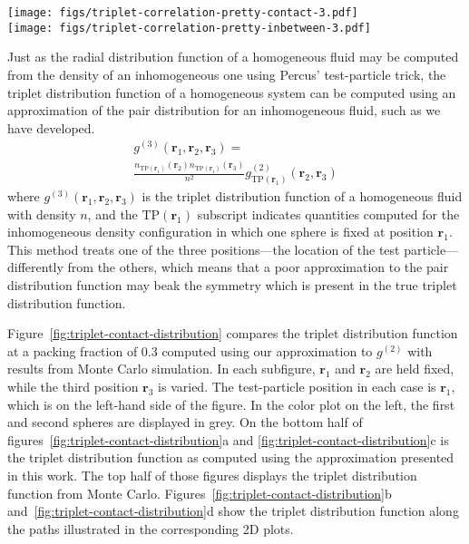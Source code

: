 \documentclass[letterpaper,twocolumn,amsmath,amssymb,pre,aps,10pt]{revtex4-1}
\newcommand{\red}[1]{{\bf \color{red} #1}}
\newcommand{\rr}{\textbf{r}}
\newcommand{\fixme}[1]{\red{[#1]}}
\begin{document}
\begin{figure*}
  \texttt{[image: figs/triplet-correlation-pretty-contact-3.pdf]}\\
  \texttt{[image: figs/triplet-correlation-pretty-inbetween-3.pdf]}
  \caption{\fixme{Remove one of, or make a note of, the two curves for this
      work}\fixme{Fix MC issue here (volume wrong?)} \fixme{Add backward curve
      for this work mc?}\fixme{z-axis wrong}The triplet
    distribution function $g^{(3)}(\rr_1,\rr_2,\rr_3)$ at packing fraction 0.3,
    plotted when $\rr_1$ and $\rr_2$ are in contact.  The color plot on the left
    shows the triplet distribution function, with white corresponding to the
    contact value of the \emph{pair} distribution function.  The plot on the
    right shows the value of $g^{(3)}$ along the path shown as a dotted line on
    the plot to the left.}\label{fig:triplet-contact-distribution}
\end{figure*}

Just as the radial distribution function of a homogeneous fluid may be
computed from the density of an inhomogeneous one using Percus'
test-particle trick, the triplet distribution function of a
homogeneous system can be computed using an approximation of the pair
distribution for an inhomogeneous fluid, such as we have developed.
\begin{multline}
    g^{(3)}(\rr_1,\rr_2,\rr_3) =\\
    \frac{n_{\textrm{TP}(\rr_1)}(\rr_2)
      n_{\textrm{TP}(\rr_1)}(\rr_3)}{n^2}
    g^{(2)}_{\textrm{TP}(\rr_1)}(\rr_2,\rr_3)
\end{multline}
where $g^{(3)}(\rr_1,\rr_2,\rr_3)$ is the triplet distribution
function of a homogeneous fluid with density $n$, and the
$\textrm{TP}(\rr_1)$ subscript indicates quantities computed for the
inhomogeneous density configuration in which one sphere is fixed at
position $\rr_1$.  This method treats one of the three positions---the
location of the test particle---differently from the others, which
means that a poor approximation to the pair distribution function may
beak the symmetry which is present in the true triplet distribution
function.

Figure~\ref{fig:triplet-contact-distribution} compares the triplet
distribution function at a packing fraction of 0.3 computed using our
approximation to $g^{(2)}$ with results from Monte Carlo simulation.
In each subfigure, $\rr_1$ and $\rr_2$ are held fixed, while the third
position $\rr_3$ is varied.  The test-particle position in each case
is $\rr_1$, which is on the left-hand side of the figure.  In the
color plot on the left, the first and second spheres are displayed in
grey.  On the bottom half of
figures~\ref{fig:triplet-contact-distribution}a and
\ref{fig:triplet-contact-distribution}c is the triplet distribution
function as computed using the approximation presented in this work.
The top half of those figures displays the triplet distribution
function from Monte Carlo.
Figures~\ref{fig:triplet-contact-distribution}b
and~\ref{fig:triplet-contact-distribution}d show the triplet
distribution function along the paths illustrated in the corresponding
2D plots.
\end{document}
